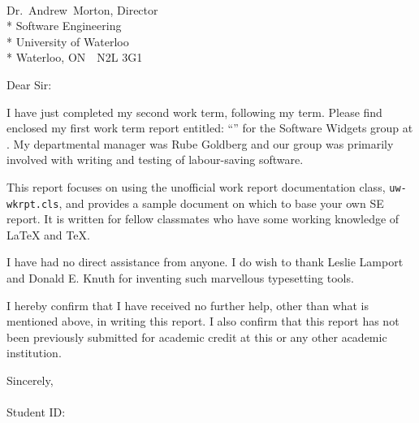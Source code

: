 \documentclass{uw-wkrpt}
\begin{document}
\clearpage
\singlespacing

\setlength{\parindent}{0pt}
\setlength{\parskip}{1ex}
\noindent\theauthor\\
\theaddress\par\noindent%
\thedate \par\noindent%
Dr.\ Andrew\ Morton, Director\\*
Software Engineering\\*
University of Waterloo\\*
Waterloo, ON\ \ N2L 3G1
\par\noindent
Dear Sir:%

\par
I have just completed my second work term, following my \theterm{} term.
Please find enclosed my first work term report entitled:
``\thetitle'' for the Software Widgets group at \theemployer.
My departmental manager was Rube Goldberg
and our group was primarily involved with writing and testing
of labour-saving software.

This report focuses on using the unofficial work report
documentation class, \texttt{uw-wkrpt.cls}, and provides a
sample document on which to base your own SE report.  It is written for
fellow classmates who have some working knowledge of \LaTeX{} and \TeX{}.

I have had no direct assistance from anyone.  I do wish to thank Leslie
Lamport and Donald E. Knuth for inventing such marvellous typesetting
tools.

I hereby confirm that I have received no further help, other than what is
mentioned above, in writing this report. I also confirm that this report has not
been previously submitted for academic credit at this or any other academic
institution.

\par\noindent
\begin{minipage}{\textwidth}
\setlength{\parindent}{3in}
\setlength{\parskip}{1ex}
\vspace*{1ex}

Sincerely,
\vspace*{0.75in}\\
\indent\theauthor\\
\indent Student ID: \theuwid
\end{minipage}
\end{document}
